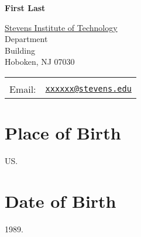 \begin{singlespace}
\def\name{First Last}

\sectionfont{\rmfamily\mdseries\normalsize}
\subsectionfont{\rmfamily\mdseries\itshape\normalsize}


\setlength\parindent{0em}

\renewenvironment{itemize}{
  \begin{list}{}{
    \setlength{\leftmargin}{1.5em}
  }
}{
  \end{list}
}

{\LARGE \bf \name}


\vspace{0.25in}

\begin{minipage}{0.45\linewidth}
  \href{http://www.stevens.edu/}{Stevens Institute of Technology} \\
  Department \\
  Building \\
  Hoboken, NJ 07030
\end{minipage}
\begin{minipage}{0.45\linewidth}
  \begin{tabular}{ll}
    \\
    \\
    Email: & \href{mailto:xxxxxx@stevens.edu}{\tt xxxxxx@stevens.edu} \\
  \end{tabular}
\end{minipage}

\section*{\textbf{Place of Birth}}
\begin{itemize}
\item US.
\end{itemize}

\section*{\textbf{Date of Birth}}
\begin{itemize}
\item 1989.
\end{itemize}


\end{singlespace}

